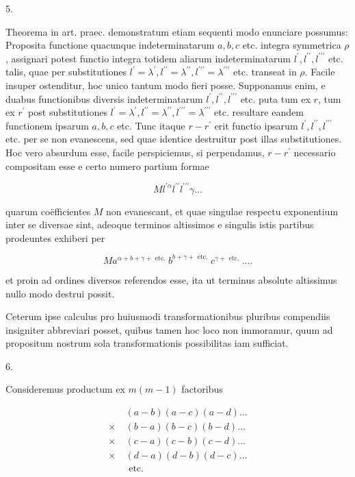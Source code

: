\documentclass[10pt]{article}
\begin{document}
5.

Theorema in art. praec. demonstratum etiam sequenti modo enunciare possumus: Proposita functione quacunque indeterminatarum \(a, b, c\) etc. integra symmetrica \(\rho\), assignari potest functio integra totidem aliarum indeterminatarum \(l^{\prime}, l^{\prime \prime}, l^{\prime \prime \prime}\) etc. talis, quae per substitutiones \(l^{\prime}=\lambda^{\prime}, l^{\prime \prime}=\lambda^{\prime \prime}, l^{\prime \prime \prime}=\lambda^{\prime \prime \prime}\) etc. transeat
in \(\rho\). Facile insuper ostenditur, hoc unico tantum modo fieri posse. Supponamus enim, e duabus functionibus diversis indeterminatarum \(l^{\prime}, l^{\prime \prime}, l^{\prime \prime \prime}\) etc. puta tum ex \(r\), tum ex \(r^{\prime}\) post substitutiones \(l^{\prime}=\lambda^{\prime}, l^{\prime \prime}=\lambda^{\prime \prime}, l^{\prime \prime \prime}=\lambda^{\prime \prime \prime}\) etc. resultare eandem functionem ipsarum \(a, b, c\) etc. Tunc itaque \(r-r^{\prime}\) erit functio ipsarum \(l^{\prime}, l^{\prime \prime}, l^{\prime \prime \prime}\) etc. per se non evanescens, sed quae identice destruitur post illas substitutiones. Hoc vero absurdum esse, facile perspiciemus, si perpendamus, \(r-r^{\prime}\) necessario compositam esse e certo numero partium formae

\[
M l^{\prime \alpha} l^{\prime \prime} l^{\prime \prime \prime} \gamma \ldots
\]

quarum coëfficientes \(M\) non evanescant, et quae singulae respectu exponentium inter se diversae sint, adeoque terminos altissimos e singulis istis partibus prodeuntes exhiberi per

\[
M a^{\alpha+b+\gamma+\text { etc. }} b^{b+\gamma+\text { etc. }} c^{\gamma+\text { etc. }} . . . .
\]

et proin ad ordines diversos referendos esse, ita ut terminus absolute altissimus nullo modo destrui possit.

Ceterum ipse calculus pro huiusmodi transformationibus pluribus compendiis insigniter abbreviari posset, quibus tamen hoc loco non immoramur, quum ad propositum nostrum sola transformationis possibilitas iam sufficiat.

6.

Consideremus productum ex \(m(m-1)\) factoribus

\[
\begin{aligned}
& (a-b)(a-c)(a-d) \ldots \\
\times & (b-a)(b-c)(b-d) \ldots \\
\times & (c-a)(c-b)(c-d) \ldots \\
\times & (d-a)(d-b)(d-c) \ldots \\
\quad & \text { etc. }
\end{aligned}
\]
\end{document}
